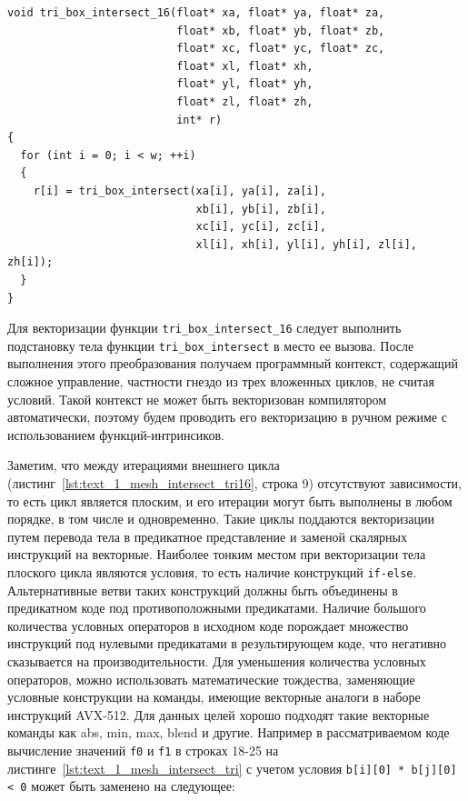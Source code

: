 \begin{lstlisting}[caption={Исходная реализация функции, объединяющей 16 вызовов функции \texttt{tri\_box\_intersect}.},label={lst:text_1_mesh_intersect_tri16}]
void tri_box_intersect_16(float* xa, float* ya, float* za,
                          float* xb, float* yb, float* zb,
                          float* xc, float* yc, float* zc,
                          float* xl, float* xh,
                          float* yl, float* yh,
                          float* zl, float* zh,
                          int* r)
{
  for (int i = 0; i < w; ++i)
  {
    r[i] = tri_box_intersect(xa[i], ya[i], za[i],
                             xb[i], yb[i], zb[i],
                             xc[i], yc[i], zc[i],
                             xl[i], xh[i], yl[i], yh[i], zl[i], zh[i]);
  }
}
\end{lstlisting}

Для векторизации функции \texttt{tri\_box\_intersect\_16} следует выполнить подстановку тела функции \texttt{tri\_box\_intersect} в место ее вызова.
После выполнения этого преобразования получаем программный контекст, содержащий сложное управление, частности гнездо из трех вложенных циклов, не считая условий.
Такой контекст не может быть векторизован компилятором автоматически, поэтому будем проводить его векторизацию в ручном режиме с использованием функций-интринсиков.

Заметим, что между итерациями внешнего цикла (листинг~\ref{lst:text_1_mesh_intersect_tri16}, строка 9) отсутствуют зависимости, то есть цикл является плоским, и его итерации могут быть выполнены в любом порядке, в том числе и одновременно.
Такие циклы поддаются векторизации путем перевода тела в предикатное представление и заменой скалярных инструкций на векторные.
Наиболее тонким местом при векторизации тела плоского цикла являются условия, то есть наличие конструкций \texttt{if-else}.
Альтернативные ветви таких конструкций должны быть объединены в предикатном коде под противоположными предикатами.
Наличие большого количества условных операторов в исходном коде порождает множество инструкций под нулевыми предикатами в результирующем коде, что негативно сказывается на производительности.
Для уменьшения количества условных операторов, можно использовать математические тождества, заменяющие условные конструкции на команды, имеющие векторные аналоги в наборе инструкций AVX-512.
Для данных целей хорошо подходят такие векторные команды как abs, min, max, blend и другие.
Например в рассматриваемом коде вычисление значений \texttt{f0} и \texttt{f1} в строках 18-25 на листинге~\ref{lst:text_1_mesh_intersect_tri} с учетом условия \texttt{b[i][0] * b[j][0] < 0} может быть заменено на следующее:

